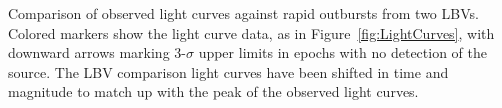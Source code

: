 Comparison of observed \spock light curves against rapid outbursts
from two LBVs. Colored markers show the \spock light curve data, as in
Figure~\ref{fig:LightCurves}, with downward arrows marking 3-$\sigma$
upper limits in epochs with no detection of the \spock source. The LBV
comparison light curves have been shifted in time and magnitude to
match up with the peak of the observed light curves.
\label{fig:LBVLightCurveComparison}
